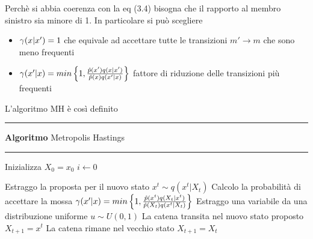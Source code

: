 Perchè   si abbia coerenza con la eq (3.4) bisogna che il rapporto al membro sinistro sia minore di 1. In particolare si può scegliere

\begin{itemize}
\item $\gamma(x|x')=1$ che equivale ad accettare tutte le transizioni $m' \rightarrow m$ che sono meno
frequenti
\item $\gamma(x'|x)=min\left\lbrace 1,\frac{\hat{p}(x')q(x|x')}{\hat{p}(x)q(x'|x)}\right\rbrace$ fattore di riduzione delle transizioni più  frequenti
\end{itemize}
\newpage
 L'algoritmo MH è    così definito\vspace{1em}\\
\hrule 
\textbf{Algoritmo} Metropolis Hastings
\hrule



\begin{algorithmic}
\State Inizializza  $X_0=x_0$
    \State $i\gets 0$

\State Estraggo la proposta per il nuovo stato $x^t \sim q(x^t |X_t)$
\State Calcolo la probabilità di accettare la mossa $\gamma(x'|x)=min\left\lbrace 1,\frac{\hat{p}(x^t)q(X_t | x^t)}{\hat{p}(X_t)q(x^t|X_t  )}\right\rbrace$
\State Estraggo una variabile da una distribuzione uniforme $u\sim U(0,1)$
 \State La catena transita nel nuovo stato proposto $X_{t+1}=x^t$
\Else
\State La catena rimane nel vecchio stato $X_{t+1}=X_t$
\EndIf
\EndFor
\end{algorithmic}

